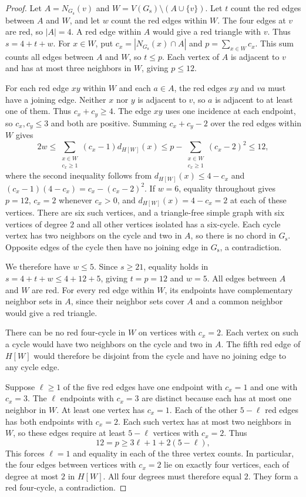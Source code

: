 \documentclass[preprint,11pt,numbers]{elsarticle-arxiv}
\numberwithin{equation}{section}
\theoremstyle{definition}
\begin{document}
\begin{proof}
Let $A=N_{G_{\mathrm s}}(v)$ and
$W=V(G_{\mathrm s})\setminus(A\cup\{v\})$. Let $t$ count the red
edges between $A$ and $W$, and let $w$ count the red edges within
$W$. The four edges at $v$ are red, so $|A|=4$. A red edge within
$A$ would give a red triangle with $v$. Thus $s=4+t+w$. For
$x\in W$, put $c_x=|N_{G_{\mathrm s}}(x)\cap A|$ and
$p=\sum_{x\in W}c_x$. This sum counts all edges between $A$ and
$W$, so $t\leq p$. Each vertex of $A$ is adjacent to $v$ and has
at most three neighbors in $W$, giving $p\leq12$.

For each red edge $xy$ within $W$ and each $a\in A$, the red edges
$xy$ and $va$ must have a joining edge. Neither $x$ nor $y$ is
adjacent to $v$, so $a$ is adjacent to at least one of them.
Thus $c_x+c_y\geq4$. The edge $xy$ uses one incidence at each
endpoint, so $c_x,c_y\leq3$ and both are positive. Summing
$c_x+c_y-2$ over the red edges within $W$ gives
\[
 2w\leq
 \sum_{\substack{x\in W\\c_x\geq1}}(c_x-1)d_{H[W]}(x)
 \leq p-\sum_{\substack{x\in W\\c_x\geq1}}(c_x-2)^2
 \leq12,
\]
where the second inequality follows from
$d_{H[W]}(x)\leq4-c_x$ and
$(c_x-1)(4-c_x)=c_x-(c_x-2)^2$.
If $w=6$, equality throughout gives $p=12$, $c_x=2$ whenever
$c_x>0$, and $d_{H[W]}(x)=4-c_x=2$ at each of these vertices.
There are six such vertices, and a triangle-free simple graph
with six vertices of degree $2$ and all other vertices isolated
has a six-cycle. Each cycle vertex has two neighbors on the
cycle and two in $A$, so there is no chord in $G_{\mathrm s}$.
Opposite edges of the cycle then have no joining edge in
$G_{\mathrm s}$, a contradiction.

We therefore have $w\leq5$. Since $s\geq21$, equality holds
in $s=4+t+w\leq4+12+5$, giving $t=p=12$ and $w=5$. All edges
between $A$ and $W$ are red. For every red edge within $W$,
its endpoints have complementary neighbor sets in $A$, since
their neighbor sets cover $A$ and a common neighbor would give
a red triangle.

There can be no red four-cycle in $W$ on vertices with $c_x=2$.
Each vertex on such a cycle would have two neighbors on the cycle
and two in $A$. The fifth red edge of $H[W]$ would therefore be
disjoint from the cycle and have no joining edge to any cycle edge.

Suppose $\ell\geq1$ of the five red edges have one endpoint with
$c_x=1$ and one with $c_x=3$. The $\ell$ endpoints with $c_x=3$
are distinct because each has at most one neighbor in $W$.
At least one vertex has $c_x=1$. Each of the other $5-\ell$ red
edges has both endpoints with $c_x=2$. Each such vertex has at
most two neighbors in $W$, so these edges require at least
$5-\ell$ vertices with $c_x=2$. Thus
\[
 12=p\geq3\ell+1+2(5-\ell),
\]
This forces $\ell=1$ and equality in each of the three vertex
counts. In particular, the four edges between vertices with
$c_x=2$ lie on exactly four vertices, each of degree at most
$2$ in $H[W]$. All four degrees must therefore equal $2$.
They form a red four-cycle, a contradiction.


\end{proof}
\end{document}
